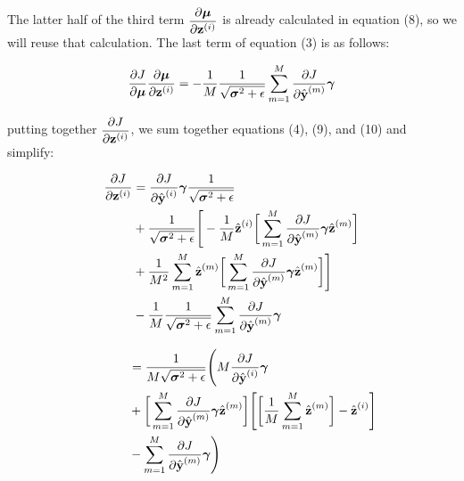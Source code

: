 \documentclass{article}
\begin{document}
\begin{multicols*}{2}
The latter half of the third term $\begin{aligned}
    {\partial \boldsymbol{\mu}\over \partial \textbf{z}^{(i)}}
\end{aligned}$ is already calculated in equation (8), so we will reuse that
calculation. The last term of equation (3) is as follows:

\begin{equation}
    {\partial J \over \partial \boldsymbol{\mu}} 
    {\partial \boldsymbol{\mu} \over \partial \textbf{z}^{(i)}}
    =-{1\over M}{1 \over \sqrt{\boldsymbol{\sigma}^2 + \epsilon}}
    \sum_{m=1}^M {\partial J \over \partial \hat{\textbf{y}}^{(m)}}
    \boldsymbol{\gamma}
\end{equation}

putting together $\begin{aligned}
    {\partial J \over \partial \textbf{z}^{(i)}}
\end{aligned}$, we sum together equations (4), (9), and (10) and simplify:

\begin{equation}
    \begin{aligned}
        {\partial J \over \partial \textbf{z}^{(i)}}
        & = {\partial J \over \partial \hat{\textbf{y}}^{(i)}}
        \boldsymbol{\gamma} 
        {1 \over \sqrt{\boldsymbol{\sigma}^2 + \epsilon}} \\
        & + {1 \over \sqrt{\boldsymbol{\sigma}^2 + \epsilon}}\Bigg[-{1 \over M} \hat{\textbf{z}}^{(i)} \bigg[
            \sum_{m = 1}^M {\partial J \over \partial \hat{\textbf{y}}^{(m)}} 
            \boldsymbol{\gamma}
            \hat{\textbf{z}}^{(m)} \bigg]\\
        & +{1 \over M^2} \sum_{m=1}^M \hat{\textbf{z}}^{(m)}
            \bigg[
            \sum_{m = 1}^M {\partial J \over \partial \hat{\textbf{y}}^{(m)}} 
            \boldsymbol{\gamma}
            \hat{\textbf{z}}^{(m)}\bigg]\Bigg]\\
        & -{1\over M}{1 \over \sqrt{\boldsymbol{\sigma}^2 + \epsilon}}
        \sum_{m=1}^M {\partial J \over \partial \hat{\textbf{y}}^{(m)}}
        \boldsymbol{\gamma}\notag
    \end{aligned}
\end{equation}


\begin{equation}
    \begin{aligned}
        \ \ \ \ \ \ \ \ \ \  & = {1\over M\sqrt{\boldsymbol{\sigma}^2 + \epsilon}}\Bigg(M{\partial J  \over \partial \hat{\textbf{y}}^{(i)}}\boldsymbol{\gamma} \\
        & + \bigg[\sum_{m=1}^M{\partial J  \over \partial \hat{\textbf{y}}^{(m)}}\boldsymbol{\gamma}\hat{\textbf{z}}^{(m)}\bigg]
        \Bigg[\bigg[{1\over M}\sum_{m=1}^M\hat{\textbf{z}}^{(m)}\bigg] -  \hat{\textbf{z}}^{(i)}\Bigg] \\
        & - \sum_{m=1}^M{\partial J  \over \partial \hat{\textbf{y}}^{(m)}}\boldsymbol{\gamma}\Bigg)
    \end{aligned}
\end{equation}


\end{multicols*}
\end{document}
